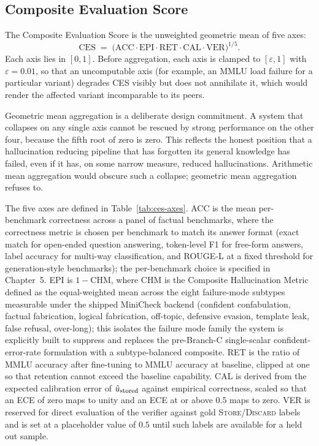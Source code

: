 \subsection{Composite Evaluation Score}
\label{sec:ces}

The Composite Evaluation Score is the unweighted geometric mean of five axes:
\begin{equation}
\mathrm{CES} \;=\; \bigl(\mathrm{ACC} \cdot \mathrm{EPI} \cdot \mathrm{RET} \cdot \mathrm{CAL} \cdot \mathrm{VER}\bigr)^{1/5}.
\label{eq:ces}
\end{equation}
Each axis lies in $[0, 1]$. Before aggregation, each axis is clamped to $[\varepsilon, 1]$ with $\varepsilon = 0.01$, so that an uncomputable axis (for example, an MMLU load failure for a particular variant) degrades CES visibly but does not annihilate it, which would render the affected variant incomparable to its peers.

Geometric mean aggregation is a deliberate design commitment. A system that collapses on any single axis cannot be rescued by strong performance on the other four, because the fifth root of zero is zero. This reflects the honest position that a hallucination reducing pipeline that has forgotten its general knowledge has failed, even if it has, on some narrow measure, reduced hallucinations. Arithmetic mean aggregation would obscure such a collapse; geometric mean aggregation refuses to.

The five axes are defined in Table~\ref{tab:ces-axes}. ACC is the mean per-benchmark correctness across a panel of factual benchmarks, where the correctness metric is chosen per benchmark to match its answer format (exact match for open-ended question answering, token-level F1 for free-form answers, label accuracy for multi-way classification, and ROUGE-L at a fixed threshold for generation-style benchmarks); the per-benchmark choice is specified in Chapter~5. EPI is $1 - \mathrm{CHM}$, where CHM is the Composite Hallucination Metric defined as the equal-weighted mean across the eight failure-mode subtypes measurable under the shipped MiniCheck backend (confident confabulation, factual fabrication, logical fabrication, off-topic, defensive evasion, template leak, false refusal, over-long); this isolates the failure mode family the system is explicitly built to suppress and replaces the pre-Branch-C single-scalar confident-error-rate formulation with a subtype-balanced composite. RET is the ratio of MMLU accuracy after fine-tuning to MMLU accuracy at baseline, clipped at one so that retention cannot exceed the baseline capability. CAL is derived from the expected calibration error of $\hat{u}_{\text{stored}}$ against empirical correctness, scaled so that an ECE of zero maps to unity and an ECE at or above $0.5$ maps to zero. VER is reserved for direct evaluation of the verifier against gold \textsc{Store}/\textsc{Discard} labels and is set at a placeholder value of $0.5$ until such labels are available for a held out sample.

